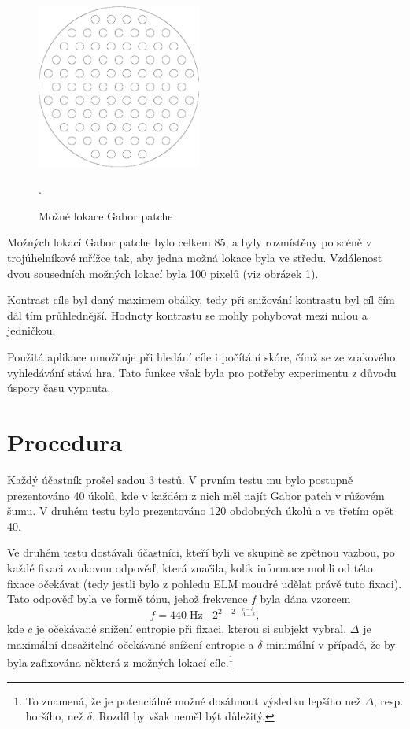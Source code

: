 \begin{figure}
\centering
\includegraphics[width=0.48\textwidth]{img/locations_outline.png}
\caption {Možné lokace Gabor patche}.
\label{LokaceGP}
\end{figure}

Možných lokací Gabor patche bylo celkem 85, a byly rozmístěny po scéně v
trojúhelníkové mřížce tak, aby jedna možná lokace byla ve středu. Vzdálenost
dvou sousedních možných lokací byla 100 pixelů (viz obrázek \ref{LokaceGP}). 

Kontrast cíle byl daný maximem obálky, tedy při snižování kontrastu byl cíl čím
dál tím průhlednější. Hodnoty kontrastu se mohly pohybovat mezi nulou a
jedničkou.

Použitá aplikace umožňuje při hledání cíle i počítání skóre, čímž se ze
zrakového vyhledávání stává hra. Tato funkce však byla pro potřeby experimentu
z důvodu úspory času vypnuta. 

\section{Procedura}

Každý účastník prošel sadou 3 testů. V prvním testu mu bylo postupně
prezentováno 40 úkolů, kde v každém z nich měl najít Gabor patch v růžovém
šumu.  V druhém testu bylo prezentováno 120 obdobných úkolů a ve třetím opět
40. 

Ve druhém testu dostávali účastníci, kteří byli ve skupině se zpětnou
vazbou, po každé fixaci zvukovou odpověď, která značila, kolik informace mohli
od této fixace očekávat (tedy jestli bylo z pohledu ELM moudré udělat právě
tuto fixaci). Tato odpověď byla ve formě tónu, jehož frekvence $f$ byla dána
vzorcem $$f = 440\operatorname{Hz}\cdot2^{2-2\cdot\frac{c - \delta}{\Delta -
\delta}},$$ kde $c$ je očekávané snížení entropie při fixaci, kterou si subjekt
vybral, $\Delta$ je maximální dosažitelné očekávané snížení entropie a $\delta$
minimální v případě, že by byla zafixována některá z možných lokací
cíle.\footnote{To znamená, že je potenciálně možné dosáhnout výsledku lepšího
než $\Delta$, resp. horšího, než $\delta$. Rozdíl by však neměl být důležitý.} 

